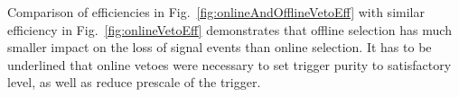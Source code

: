 Comparison of efficiencies in Fig.~\ref{fig:onlineAndOfflineVetoEff} with similar efficiency in Fig.~\ref{fig:onlineVetoEff} demonstrates that offline selection has much smaller impact on the loss of signal events than online selection. It has to be underlined that online vetoes were necessary to set trigger purity to satisfactory level, as well as reduce prescale of the trigger.
\begin{figure}[h]
\centering
\parbox{0.4725\textwidth}{
  \centering
  \begin{subfigure}[b]{\linewidth}
  \end{subfigure}\\
  \begin{subfigure}[b]{\linewidth}\addtocounter{subfigure}{1}

\end{subfigure}}
\end{figure}
